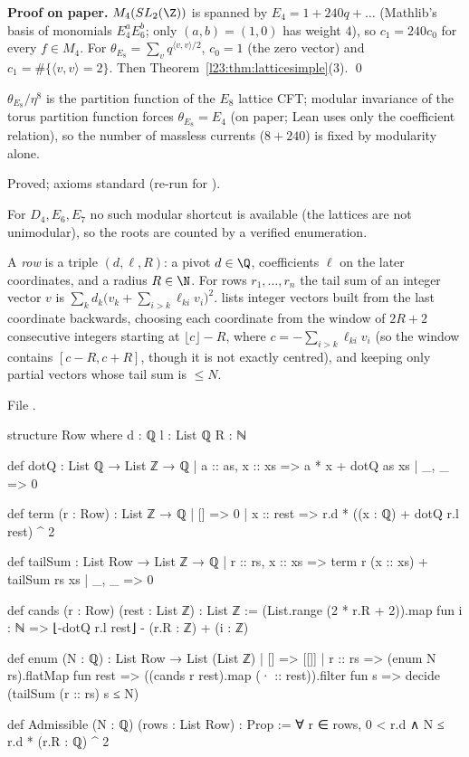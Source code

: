 \textbf{Proof on paper.} $M_4(SL_2(\Z))$ is spanned by $E_4=1+240q+\dots$ (Mathlib's basis of monomials $E_4^aE_6^b$; only $(a,b)=(1,0)$
has weight $4$), so $c_1=240c_0$ for every $f\in M_4$. For $\theta_{E_8}=\sum_v q^{\langle v,v\rangle/2}$, $c_0=1$ (the zero vector) and
$c_1=\#\{\langle v,v\rangle=2\}$. Then Theorem~\ref{l23:thm:latticesimple}(3). \qed

\begin{physics}
$\theta_{E_8}/\eta^8$ is the partition function of the $E_8$ lattice CFT; modular invariance of the torus partition function forces
$\theta_{E_8}=E_4$ (on paper; Lean uses only the coefficient relation), so the number of massless currents ($8+240$) is fixed by
modularity alone.
\end{physics}

\begin{status}
Proved; axioms standard (re-run for ).
\end{status}

For $D_4,E_6,E_7$ no such modular shortcut is available (the lattices are not unimodular), so the roots are counted by a verified
enumeration.

\begin{definition}\label{l23:def:enum}
A \emph{row} is a triple $(d,\ell,R)$: a pivot $d\in\Q$, coefficients $\ell$ on the later coordinates, and a radius $R\in\N$. For rows
$r_1,\dots,r_n$ the tail sum of an integer vector $v$ is $\sum_k d_k\big(v_k+\sum_{i>k}\ell_{ki}v_i\big)^2$.  lists
integer vectors built from the last coordinate backwards, choosing each coordinate from the window of $2R+2$ consecutive integers starting at $\lfloor c\rfloor-R$, where
$c=-\sum_{i>k}\ell_{ki}v_i$ (so the window contains $[c-R,c+R]$, though it is not exactly centred), and keeping only partial vectors whose tail sum is $\le N$.
\end{definition}
\noindent File .
\begin{leancode}
structure Row where
  d : ℚ
  l : List ℚ
  R : ℕ

def dotQ : List ℚ → List ℤ → ℚ
  | a :: as, x :: xs => a * x + dotQ as xs
  | _, _ => 0

def term (r : Row) : List ℤ → ℚ
  | [] => 0
  | x :: rest => r.d * ((x : ℚ) + dotQ r.l rest) ^ 2

def tailSum : List Row → List ℤ → ℚ
  | r :: rs, x :: xs => term r (x :: xs) + tailSum rs xs
  | _, _ => 0

def cands (r : Row) (rest : List ℤ) : List ℤ :=
  (List.range (2 * r.R + 2)).map fun i : ℕ => ⌊-dotQ r.l rest⌋ - (r.R : ℤ) + (i : ℤ)

def enum (N : ℚ) : List Row → List (List ℤ)
  | [] => [[]]
  | r :: rs => (enum N rs).flatMap fun rest =>
      ((cands r rest).map (· :: rest)).filter fun s => decide (tailSum (r :: rs) s ≤ N)

def Admissible (N : ℚ) (rows : List Row) : Prop := ∀ r ∈ rows, 0 < r.d ∧ N ≤ r.d * (r.R : ℚ) ^ 2
\end{leancode}

